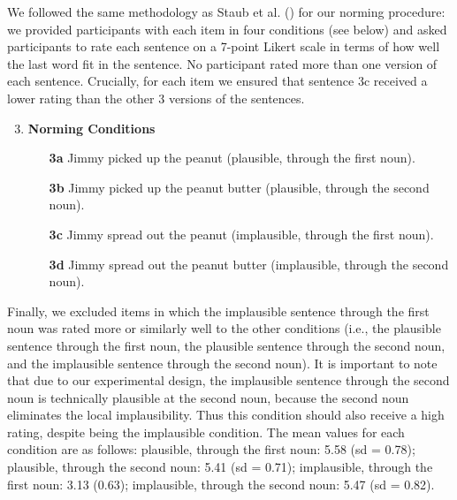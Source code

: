 \documentclass[
  12pt,
  letterpaper,
]{scrreport}
\begin{document}
We followed the same methodology as Staub et al.
() for our norming
procedure: we provided participants with each item in four conditions
(see below) and asked participants to rate each sentence on a 7-point
Likert scale in terms of how well the last word fit in the sentence. No
participant rated more than one version of each sentence. Crucially, for
each item we ensured that sentence 3c received a lower rating than the
other 3 versions of the sentences.

\begin{enumerate} \setcounter{enumi}{2}
   \item \textbf{Norming Conditions}
    \begin{enumerate}
        \item[\textbf{3a}] Jimmy picked up the peanut (plausible, through the first noun).
        \item[\textbf{3b}] Jimmy picked up the peanut butter (plausible, through the second noun).
        \item[\textbf{3c}] Jimmy spread out the peanut (implausible, through the first noun).
        \item[\textbf{3d}] Jimmy spread out the peanut butter (implausible, through the second noun).
    \end{enumerate} \label{figanext}
\end{enumerate}

Finally, we excluded items in which the implausible sentence through the
first noun was rated more or similarly well to the other conditions
(i.e., the plausible sentence through the first noun, the plausible
sentence through the second noun, and the implausible sentence through
the second noun). It is important to note that due to our experimental
design, the implausible sentence through the second noun is technically
plausible at the second noun, because the second noun eliminates the
local implausibility. Thus this condition should also receive a high
rating, despite being the implausible condition. The mean values for
each condition are as follows: plausible, through the first noun: 5.58
(sd = 0.78); plausible, through the second noun: 5.41 (sd = 0.71);
implausible, through the first noun: 3.13 (0.63); implausible, through
the second noun: 5.47 (sd = 0.82).
\end{document}
